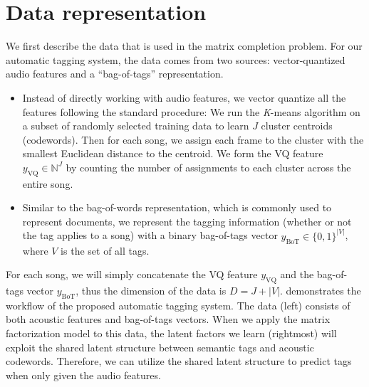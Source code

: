 \section{Data representation} \label{chpt:tagging:sec:data}
We first describe the data that is used in the matrix completion problem. For our automatic tagging system, the data comes from two sources: vector-quantized audio features and a ``bag-of-tags'' representation. 
\begin{itemize}
\item {} Instead of directly working with audio features, we vector quantize all the features following the standard procedure: We run the \emph{K}-means algorithm on a subset of randomly selected training data to learn $J$ cluster centroids (codewords). Then for each song, we assign each frame to the cluster with the smallest Euclidean distance to the centroid. We form the VQ feature $y_{\text{VQ}} \in \mathbb{N}^J$ by counting the number of assignments to each cluster across the entire song. 

\item {} Similar to the bag-of-words representation, which is commonly used to represent documents, we represent the tagging information (whether or not the tag applies to a song) with a binary bag-of-tags vector $y_{\text{BoT}}\in \{0, 1\}^{|V|}$, where $V$ is the set of all tags. \end{itemize}

For each song, we will simply concatenate the VQ feature $y_{\text{VQ}}$ and the bag-of-tags vector $y_{\text{BoT}}$, thus the dimension of the data is $D = J + |V|$.  demonstrates the workflow of the proposed automatic tagging system. The data (left) consists of both acoustic features and bag-of-tags vectors. When we apply the matrix factorization model to this data, the latent factors we learn (rightmost) will exploit the shared latent structure between semantic tags and acoustic codewords. Therefore, we can utilize the shared latent structure to predict tags when only given the audio features. 


